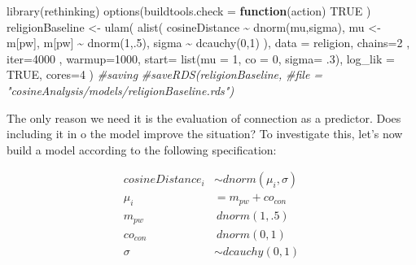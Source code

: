 \documentclass[
  12pt,
]{book}
\newenvironment{Shaded}{\begin{snugshade}}{\end{snugshade}}
\newcommand{\AttributeTok}[1]{\textcolor[rgb]{0.77,0.63,0.00}{#1}}
\newcommand{\CommentTok}[1]{\textcolor[rgb]{0.56,0.35,0.01}{\textit{#1}}}
\newcommand{\ConstantTok}[1]{\textcolor[rgb]{0.00,0.00,0.00}{#1}}
\newcommand{\ControlFlowTok}[1]{\textcolor[rgb]{0.13,0.29,0.53}{\textbf{#1}}}
\newcommand{\DecValTok}[1]{\textcolor[rgb]{0.00,0.00,0.81}{#1}}
\newcommand{\FunctionTok}[1]{\textcolor[rgb]{0.00,0.00,0.00}{#1}}
\newcommand{\NormalTok}[1]{#1}
\newcommand{\OtherTok}[1]{\textcolor[rgb]{0.56,0.35,0.01}{#1}}
\newcommand{\SpecialCharTok}[1]{\textcolor[rgb]{0.00,0.00,0.00}{#1}}
\begin{document}
\vspace{1mm}
\footnotesize

\begin{Shaded}
\begin{Highlighting}[]
\FunctionTok{library}\NormalTok{(rethinking)}
\FunctionTok{options}\NormalTok{(}\AttributeTok{buildtools.check =} \ControlFlowTok{function}\NormalTok{(action) }\ConstantTok{TRUE}\NormalTok{ )}
\NormalTok{religionBaseline }\OtherTok{\textless{}{-}} \FunctionTok{ulam}\NormalTok{(}
  \FunctionTok{alist}\NormalTok{(}
\NormalTok{    cosineDistance }\SpecialCharTok{\textasciitilde{}} \FunctionTok{dnorm}\NormalTok{(mu,sigma),}
\NormalTok{    mu }\OtherTok{\textless{}{-}}\NormalTok{ m[pw],}
\NormalTok{    m[pw] }\SpecialCharTok{\textasciitilde{}} \FunctionTok{dnorm}\NormalTok{(}\DecValTok{1}\NormalTok{,.}\DecValTok{5}\NormalTok{),}
\NormalTok{    sigma }\SpecialCharTok{\textasciitilde{}} \FunctionTok{dcauchy}\NormalTok{(}\DecValTok{0}\NormalTok{,}\DecValTok{1}\NormalTok{)}
\NormalTok{  ),}
  \AttributeTok{data =}\NormalTok{ religion,}
  \AttributeTok{chains=}\DecValTok{2}\NormalTok{ , }\AttributeTok{iter=}\DecValTok{4000}\NormalTok{ , }\AttributeTok{warmup=}\DecValTok{1000}\NormalTok{,}
  \AttributeTok{start=} \FunctionTok{list}\NormalTok{(}\AttributeTok{mu =} \DecValTok{1}\NormalTok{, }\AttributeTok{co =} \DecValTok{0}\NormalTok{, }\AttributeTok{sigma=}\NormalTok{ .}\DecValTok{3}\NormalTok{),}
  \AttributeTok{log\_lik =} \ConstantTok{TRUE}\NormalTok{, }\AttributeTok{cores=}\DecValTok{4}
\NormalTok{)}
\CommentTok{\#saving}
\CommentTok{\#saveRDS(religionBaseline, }
\CommentTok{\#file = "cosineAnalysis/models/religionBaseline.rds")}
\end{Highlighting}
\end{Shaded}

\normalsize

The only reason we need it is the evaluation of connection as a predictor. Does including it in o the model improve the situation? To investigate this, let's now build a model according to the following specification:

\begin{align}
cosineDistance_i  & \sim dnorm(\mu_i, \sigma) \\
\mu_i & = m_{pw} + co_{con}\\
m_{pw} & ~ dnorm(1,.5) \\
co_{con} & ~ dnorm(0,1) \\
\sigma &\sim  dcauchy(0,1)
\end{align}
\end{document}
